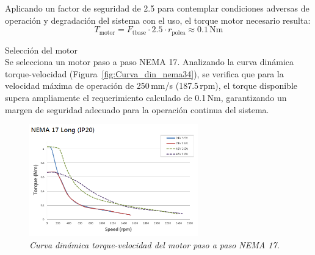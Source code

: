 Aplicando un factor de seguridad de 2.5 para contemplar condiciones adversas de operación y degradación del sistema con el uso, el torque motor necesario resulta:
\begin{equation}
T_{\text{motor}} = F_{\text{tbase}} \cdot 2.5 \cdot r_{\text{polea}} \approx 0.1\,\text{Nm}
\label{eq:torque_motor}
\end{equation}

Selección del motor\\
Se selecciona un motor paso a paso NEMA 17. Analizando la curva dinámica torque-velocidad (Figura~\ref{fig:Curva_din_nema34}), se verifica que para la velocidad máxima de operación de 250\,mm/s (187.5\,rpm), el torque disponible supera ampliamente el requerimiento calculado de 0.1\,Nm, garantizando un margen de seguridad adecuado para la operación continua del sistema. 
\begin{figure}[H]
    \centering
    \includegraphics[width=0.65\textwidth]{img/Nema17.png}
    \caption{\textit{Curva dinámica torque-velocidad del motor paso a paso NEMA 17.}}
    \label{fig:Curva_din_nema17}
\end{figure}